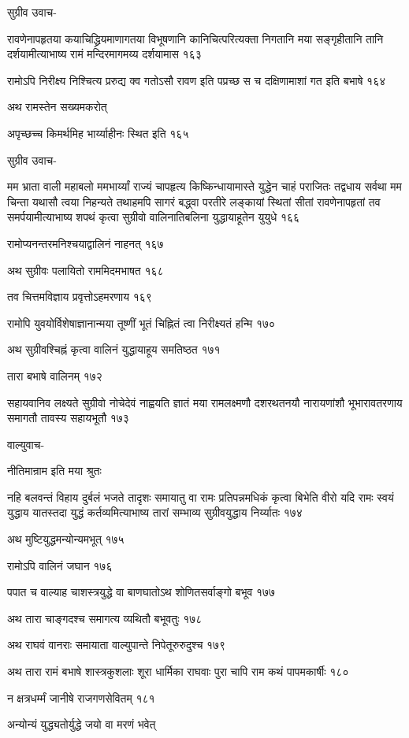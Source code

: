 सुग्रीव उवाच-

रावणेनापहृतया कयाचिद्ध्रियमाणागतया विभूषणानि कानिचित्परित्यक्ता निगतानि मया
सङ्गृहीतानि तानि दर्शयामीत्याभाष्य रामं मन्दिरमागमय्य दर्शयामास १६३

रामोऽपि निरीक्ष्य निश्चित्य प्ररुद्य क्व गतोऽसौ रावण इति पप्रच्छ स च दक्षिणामाशां गत
इति बभाषे १६४

अथ रामस्तेन सख्यमकरोत्

अपृच्छच्च किमर्थमिह भार्य्याहीनः स्थित इति १६५

सुग्रीव उवाच-

मम भ्राता वाली महाबलो ममभार्य्यां राज्यं चापहृत्य किष्किन्धायामास्ते युद्धेन चाहं
पराजितः तद्वधाय सर्वथा मम चिन्ता यथासौ त्वया निहन्यते तथाहमपि सागरं बद्ध्वा परतीरे
लङ्कायां स्थितां सीतां रावणेनापहृतां तव समर्पयामीत्याभाष्य शपथं कृत्वा सुग्रीवो
वालिनातिबलिना युद्धायाहूतेन युयुधे १६६

रामोप्यनन्तरमनिश्चयाद्वालिनं नाहनत् १६७

अथ सुग्रीवः पलायितो राममिदमभाषत १६८

तव चित्तमविज्ञाय प्रवृत्तोऽहमरणाय १६९

रामोपि युवयोर्विशेषाज्ञानान्मया तूष्णीं भूतं चिह्नितं त्वा निरीक्ष्यतं हन्मि १७०

अथ सुग्रीवश्चिह्नं कृत्वा वालिनं युद्धायाहूय समतिष्ठत १७१

तारा बभाषे वालिनम् १७२

सहायवानिव लक्ष्यते सुग्रीवो नोचेदेवं नाह्वयति ज्ञातं मया रामलक्ष्मणौ दशरथतनयौ
नारायणांशौ भूभारावतरणाय समागतौ तावस्य सहायभूतौ १७३

वाल्युवाच-

नीतिमान्राम इति मया श्रुतः

नहि बलवन्तं विहाय दुर्बलं भजते तादृशः समायातु वा रामः प्रतिपन्नमधिकं कृत्वा बिभेति वीरो
यदि रामः स्वयं युद्धाय यातस्तदा युद्धं कर्तव्यमित्याभाष्य तारां सम्भाव्य सुग्रीवयुद्धाय
निर्य्यातः १७४

अथ मुष्टियुद्धमन्योन्यमभूत् १७५

रामोऽपि वालिनं जघान १७६

पपात च वाल्याह चाशस्त्रयुद्धे वा बाणघातोऽथ शोणितसर्वाङ्गो बभूव १७७

अथ तारा चाङ्गदश्च समागत्य व्यथितौ बभूवतुः १७८

अथ राघवं वानराः समायाता वाल्युपान्ते निपेतूरुरुदुश्च १७९

अथ तारा रामं बभाषे शास्त्रकुशलाः शूरा धार्मिका राघवाः पुरा चापि राम कथं
पापमकार्षीः १८०

न क्षत्रधर्म्मं जानीषे राजगणसेवितम् १८१

अन्योन्यं युद्ध्यतोर्युद्धे जयो वा मरणं भवेत्

